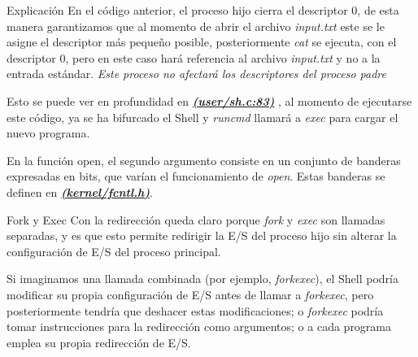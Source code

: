 \documentclass{libs/ufc_format}
\begin{document}
\begin{frame}{Explicación}
  En el código anterior, el proceso hijo cierra el descriptor 0, de esta manera garantizamos que al momento de abrir el archivo \textit{input.txt} este se le asigne el descriptor más pequeño posible, posteriormente \textit{cat} se ejecuta, con el descriptor 0, pero en este caso hará referencia al archivo \textit{input.txt} y no a la entrada estándar.
  \emph{Este proceso no afectará los descriptores del proceso padre}

  \vspace{0.4cm}

  Esto se puede ver en profundidad en \href{https://github.com/CarlosSandoval-03/xv6-riscv/blob/riscv/user/sh.c\#L83}{\textbf{\textit{(user/sh.c:83)}}} \cite{xv6}, al momento de ejecutarse este código, ya se ha bifurcado el Shell y \textit{runcmd} llamará a \textit{exec} para cargar el nuevo programa.

  \vspace{0.4cm}

  En la función open, el segundo argumento consiste en un conjunto de banderas expresadas en bits, que varían el funcionamiento de \textit{open}. Estas banderas se definen en \href{https://github.com/CarlosSandoval-03/xv6-riscv/blob/riscv/kernel/fcntl.h}{\textbf{\textit{(kernel/fcntl.h)}}}. \cite{xv6}
\end{frame}
\begin{frame}{Fork y Exec}
  Con la redirección queda claro porque \textit{fork} y \textit{exec} son llamadas separadas, y es que esto permite redirigir la E/S del proceso hijo sin alterar la configuración de E/S del proceso principal.

  \vspace{0.2cm}

  Si imaginamos una llamada combinada (por ejemplo, \textit{forkexec}), el Shell podría modificar su propia configuración de E/S antes de llamar a \textit{forkexec}, pero posteriormente tendría que deshacer estas modificaciones; o \textit{forkexec} podría tomar instrucciones para la redirección como argumentos; o a cada programa emplea su propia redirección de E/S.

\end{frame}
\end{document}
